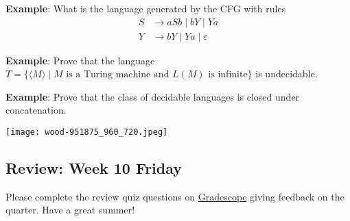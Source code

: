 \documentclass[12pt, oneside]{article}
\begin{document}
{\bf Example}: What is the language generated by the CFG with rules
\begin{align*}
    S &\to aSb \mid bY \mid Ya \\
    Y &\to bY \mid Ya \mid \varepsilon 
\end{align*}

\newpage

{\bf Example}: Prove that the language 
$T = \{ \langle M \rangle \mid \textrm{$M$ is a Turing machine and $L(M)$ is infinite}\}$ 
is undecidable.

\newpage

{\bf Example}: Prove that the class of decidable languages is closed under concatenation.
 
\newpage


\vfill

\begin{center}
\texttt{[image: wood-951875\_960\_720.jpeg]}
\end{center}

\vfill

\subsection*{Review: Week 10 Friday}

Please complete the review quiz questions on \href{http://gradescope.com}{Gradescope} giving feedback on the quarter. 
Have a great summer!
\end{document}
